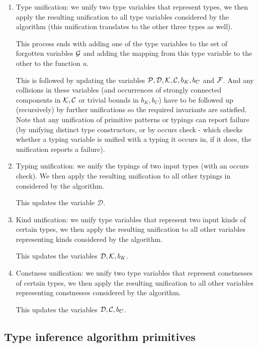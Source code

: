 \begin{enumerate}
    \item Type unification: we unify two type variables that represent types, we then apply the resulting unification to all type variables considered by the algorithm (this unification translates to the other three types as well). \label{tUni}

    This process ends with adding one of the type variables to the set of forgotten variables $\mathcal G$ and adding the mapping from this type variable to the other to the function $u$.

    This is followed by updating the variables $\mathcal P, \mathcal D, \mathcal K, \mathcal C, b_K, b_C$ and $\mathcal F$. And any collisions in these variables (and occurrences of strongly connected components in $\mathcal K, \mathcal C$ or trivial bounds in $b_K, b_C$) have to be followed up (recursively) by further unifications so the required invariants are satisfied. Note that any unification of primitive patterns or typings can report failure (by unifying distinct type constructors, or by occurs check - which checks whether a typing variable is unified with a typing it occurs in, if it does, the unification reports a failure).

    \item Typing unification: we unify the typings of two input types (with an occurs check). We then apply the resulting unification to all other typings in considered by the algorithm. \label{tyUni}

    This updates the variable $\mathcal D$.

    \item Kind unification: we unify type variables that represent two input kinds of certain types, we then apply the resulting unification to all other variables representing kinds considered by the algorithm. \label{kUni}

    This updates the variables $\mathcal D, \mathcal K, b_K$.

    \item Constness unification: we unify two type variables that represent constnesses of certain types, we then apply the resulting unification to all other variables representing constnesses considered by the algorithm. \label{cUni}

    This updates the variables $\mathcal D, \mathcal C, b_C$.
\end{enumerate}

\subsection{Type inference algorithm primitives}

